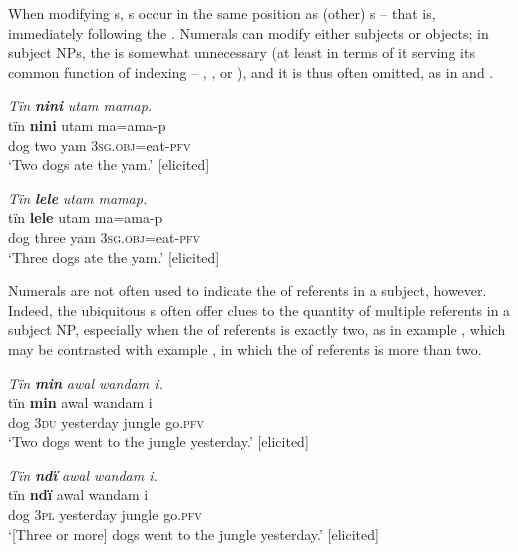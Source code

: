   When modifying s, s occur in the same position as (other) s -- that is, immediately following the . Numerals can modify either subjects or objects; in subject NPs, the  is somewhat unnecessary (at least in terms of it serving its common function of indexing  -- , , or ), and it is thus often omitted, as in  and .

\ea%
    \label{ex:det:221}
          \textit{Tïn} \textbf{\textit{nini}} \textit{utam mamap.}\\
\gll    tïn    \textbf{nini}  utam  ma=ama-p\\
    dog  two  yam  3\textsc{sg.obj}=eat-\textsc{pfv}\\
\glt `Two dogs ate the yam.’ [elicited]
\z

\ea%
    \label{ex:det:222}
          \textit{Tïn} \textbf{\textit{lele}} \textit{utam mamap.}\\
\gll    tïn    \textbf{lele}    utam  ma=ama-p\\
    dog  three  yam  3\textsc{sg.obj}=eat-\textsc{pfv}\\
\glt `Three dogs ate the yam.’ [elicited]
\z

Numerals are not often used to indicate the  of referents in a subject, however. Indeed, the ubiquitous s often offer clues to the quantity of multiple referents in a subject NP, especially when the  of referents is exactly two, as in example , which may be contrasted with example , in which the  of referents is more than two.

\ea%
    \label{ex:det:223}
          \textit{Tïn} \textbf{\textit{min}} \textit{awal wandam i.}\\
\gll    tïn    \textbf{min}  awal    wandam  i\\
    dog  3\textsc{du}  yesterday  jungle    go.\textsc{pfv}\\
\glt `Two dogs went to the jungle yesterday.’ [elicited]
\z

\ea%
    \label{ex:det:224}
          \textit{Tïn} \textbf{\textit{ndï}} \textit{awal wandam i.}\\
\gll    tïn    \textbf{ndï}  awal    wandam  i\\
    dog  \textsc{3pl}  yesterday  jungle    go\textsc{.pfv}\\
\glt `[Three or more] dogs went to the jungle yesterday.’ [elicited]
\z

